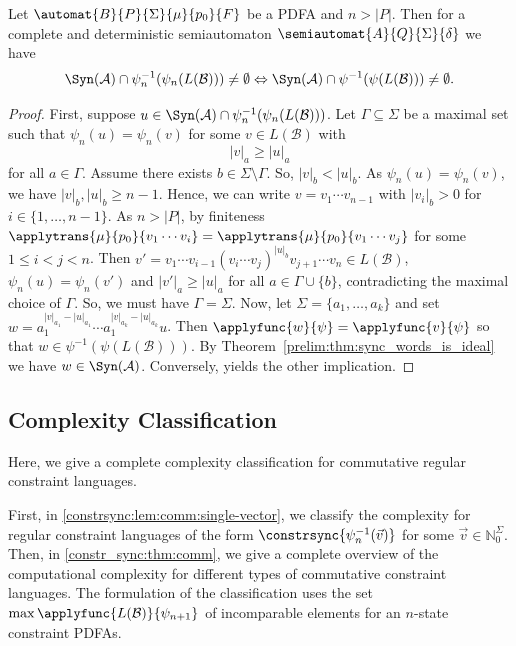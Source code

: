 \begin{proposition}
	\label{constr_sync:prop:cropped_by_B}
	Let $\automat{B}{P}{\Sigma}{\mu}{p_0}{F}$ be a PDFA and $n >|P|$.
	Then for a complete and deterministic semiautomaton $\semiautomat{A}{Q}{\Sigma}{\delta}$
	we have 
	\[ \Syn(\mathcal A) \cap \psi_n^{-1}(\psi_n(L(\mathcal B))) \ne \emptyset
	\Leftrightarrow 
	\Syn(\mathcal A) \cap \psi^{-1}(\psi(L(\mathcal B))) \ne \emptyset.
	\]
\end{proposition}
\begin{proof}
	First, suppose $u \in \Syn(\mathcal A) \cap \psi_n^{-1}(\psi_n(L(\mathcal B)))$.
	Let $\Gamma \subseteq \Sigma$ be a maximal set such that $\psi_n(u) = \psi_n(v)$
	for some $v \in L(\mathcal B)$
	with
	\[
	 |v|_a \ge |u|_a
	\]
	for all $a \in \Gamma$.
    Assume there exists $b \in \Sigma \setminus \Gamma$.
    So, $|v|_b < |u|_b$.
    As $\psi_n(u) = \psi_n(v)$,
    we have $|v|_b, |u|_b \ge n - 1$.
    Hence, we can write $v = v_1 \cdots v_{n-1}$
    with $|v_i|_b > 0$ for $i \in \{1,\ldots,n-1\}$.
    As $n > |P|$, by finiteness
    $\applytrans{\mu}{p_0}{v_1 \cdots v_i} = \applytrans{\mu}{p_0}{v_1 \cdots v_j}$
     for some $1 \le i < j < n$.
    Then $v' = v_1 \cdots v_{i-1} (v_i \cdots v_j)^{|u|_b} v_{j+1} \cdots v_n \in L(\mathcal B)$,
    $\psi_n(u) = \psi_n(v')$
    and $|v'|_a \ge |u|_a$ for all $a \in \Gamma \cup \{b\}$,
    contradicting the maximal choice of $\Gamma$.
    So, we must have $\Gamma = \Sigma$.
    Now, let $\Sigma = \{a_1, \ldots, a_k\}$ and set $w = a_1^{|v|_{a_1} - |u|_{a_1}} \cdots a_1^{|v|_{a_k} - |u|_{a_k}}u$.
    Then  $\applyfunc{w}{\psi} = \applyfunc{v}{\psi}$
    so that $w \in \psi^{-1}(\psi(L(\mathcal B)))$.
    By Theorem~\ref{prelim:thm:sync_words_is_ideal}
    we have $w \in \Syn(\mathcal A)$.
    Conversely, 
	yields the other implication.		
\end{proof} 

\subsection{Complexity Classification}
\label{comm:subsec:classification}

Here, we give a complete complexity classification for commutative regular
constraint languages.

First, in \cref{constrsync:lem:comm:single-vector}, 
we classify the complexity for regular constraint languages
of the form $\constrsync{\psi_n^{-1}(\vec{v})}$ for some $\vec{v} \in \mathbb N_0^{\Sigma}$.
Then, in \cref{constr_sync:thm:comm}, we 
give a complete overview of the computational complexity for different
types of commutative constraint languages.
The formulation of the classification
uses the set $\max \applyfunc{L(\mathcal B)}{\psi_{n+1}}$
of incomparable elements for an $n$-state constraint PDFAs.

